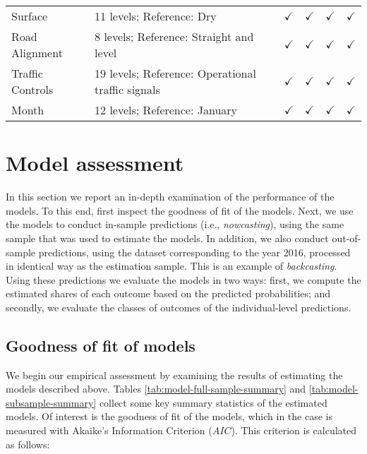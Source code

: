 \documentclass[]{elsarticle} %
\begin{document}
\begin{table}
{\begin{tabular}[t]{llllll}
\hspace{1em}Surface & 11 levels; Reference: Dry & $\checkmark$ & $\checkmark$ & $\checkmark$ & $\checkmark$\\
\rowcolor{gray!6}  \hspace{1em}Road Alignment & 8 levels; Reference: Straight and level & $\checkmark$ & $\checkmark$ & $\checkmark$ & $\checkmark$\\
\hspace{1em}Traffic Controls & 19 levels; Reference: Operational traffic signals & $\checkmark$ & $\checkmark$ & $\checkmark$ & $\checkmark$\\
\rowcolor{gray!6}  \hspace{1em}Month & 12 levels; Reference: January & $\checkmark$ & $\checkmark$ & $\checkmark$ & $\checkmark$\\
\bottomrule
\end{tabular}}
\end{table}

\hypertarget{sec:assessment}{%
\section{Model assessment}\label{sec:assessment}}

In this section we report an in-depth examination of the performance of
the models. To this end, first inspect the goodness of fit of the
models. Next, we use the models to conduct in-sample predictions (i.e.,
\emph{nowcasting}), using the same sample that was used to estimate the
models. In addition, we also conduct out-of-sample predictions, using
the dataset corresponding to the year 2016, processed in identical way
as the estimation sample. This is an example of \emph{backcasting}.
Using these predictions we evaluate the models in two ways: first, we
compute the estimated shares of each outcome based on the predicted
probabilities; and secondly, we evaluate the classes of outcomes of the
individual-level predictions.

\hypertarget{goodness-of-fit-of-models}{%
\subsection{Goodness of fit of models}\label{goodness-of-fit-of-models}}

We begin our empirical assessment by examining the results of estimating
the models described above. Tables \ref{tab:model-full-sample-summary}
and \ref{tab:model-subsample-summary} collect some key summary
statistics of the estimated models. Of interest is the goodness of fit
of the models, which in the case is measured with Akaike's Information
Criterion (\(AIC\)). This criterion is calculated as follows:
\end{document}
